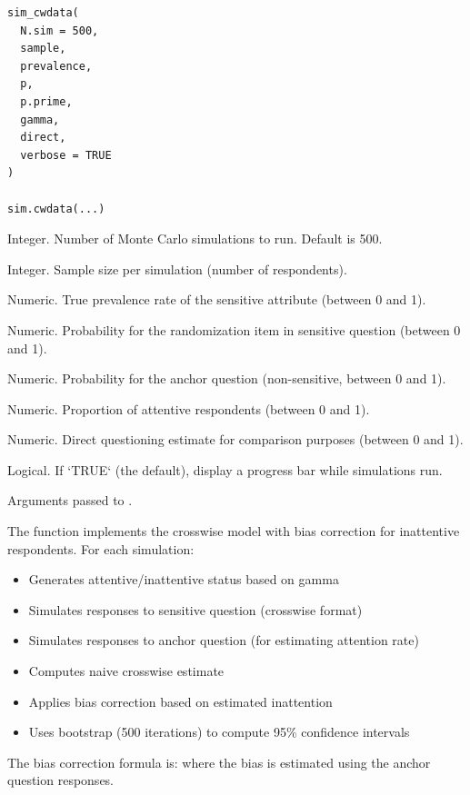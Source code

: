 \documentclass[a4paper]{book}
\begin{document}
%
\begin{Usage}
\begin{verbatim}
sim_cwdata(
  N.sim = 500,
  sample,
  prevalence,
  p,
  p.prime,
  gamma,
  direct,
  verbose = TRUE
)

sim.cwdata(...)
\end{verbatim}
\end{Usage}
%
\begin{Arguments}
\begin{ldescription}
\item[\code{N.sim}] Integer. Number of Monte Carlo simulations to run. Default is 500.

\item[\code{sample}] Integer. Sample size per simulation (number of respondents).

\item[\code{prevalence}] Numeric. True prevalence rate of the sensitive attribute
(between 0 and 1).

\item[\code{p}] Numeric. Probability for the randomization item in sensitive question (between 0 and 1).

\item[\code{p.prime}] Numeric. Probability for the anchor question (non-sensitive, between 0 and 1).

\item[\code{gamma}] Numeric. Proportion of attentive respondents (between 0 and 1).

\item[\code{direct}] Numeric. Direct questioning estimate for comparison purposes (between 0 and 1).

\item[\code{verbose}] Logical. If `TRUE` (the default), display a progress bar while
simulations run.

\item[\code{...}] Arguments passed to .
\end{ldescription}
\end{Arguments}
%
\begin{Details}
The function implements the crosswise model with bias correction for inattentive
respondents. For each simulation:
\begin{itemize}

\item{} Generates attentive/inattentive status based on gamma
\item{} Simulates responses to sensitive question (crosswise format)
\item{} Simulates responses to anchor question (for estimating attention rate)
\item{} Computes naive crosswise estimate
\item{} Applies bias correction based on estimated inattention
\item{} Uses bootstrap (500 iterations) to compute 95\% confidence intervals

\end{itemize}


The bias correction formula is:
where the bias is estimated using the anchor question responses.
\end{Details}
\end{document}
